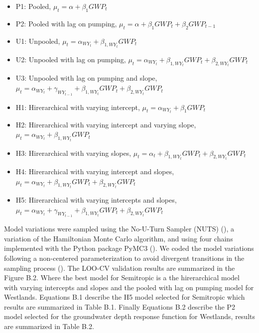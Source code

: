 \documentclass[11pt,a4paper]{article}
\begin{document}
\begin{itemize}[noitemsep,topsep=0pt,parsep=0pt,partopsep=0pt]
  \item P1: Pooled,   $\mu_t = \alpha + \beta_{1}GWP_{t}$
  \item P2: Pooled with lag on pumping,   $\mu_t = \alpha + \beta_{1}GWP_{t} + \beta_{2}GWP_{t-1} $
  \item U1: Unpooled, $\mu_t = \alpha_{WY_{t}} + \beta_{1,WY_{t}}GWP_{t}$
  \item U2: Unpooled with lag on pumping, $\mu_t = \alpha_{WY_{t}} + \beta_{1,WY_{t}}GWP_{t} + \beta_{2,WY_{t}}GWP_{t} $
  \item U3: Unpooled with lag on pumping and slope, $\mu_t =  \alpha_{WY_{t}} + \gamma_{WY_{t-1}} + \beta_{1,WY_{t}}GWP_{t} + \beta_{2,WY_{t}}GWP_{t}$
  \item H1: Hirerarchical with varying intercept, $\mu_t = \alpha_{WY_{t}} + \beta_{1}GWP_{t}$
  \item H2: Hirerarchical with varying intercept and varying slope, $\mu_t = \alpha_{WY_{t}} + \beta_{1,WY_{t}}GWP_{t}$
  \item H3: Hirerarchical with varying slopes, $\mu_t = \alpha_t + \beta_{1,WY_{t}}GWP_{t} + \beta_{2,WY_{t}}GWP_{t}$
  \item H4: Hirerarchical with varying intercept and slopes, $\mu_t = \alpha_{WY_{t}} + \beta_{1,WY_{t}}GWP_{t} + \beta_{2,WY_{t}}GWP_{t}$
  \item H5: Hirerarchical with varying intercepts and slopes, $\mu_t = \alpha_{WY_{t}} + \gamma_{WY_{t-1}} + \beta_{1,WY_{t}}GWP_{t} + \beta_{2,WY_{t}}GWP_{t}$
\end{itemize}


Model variations were sampled using the No-U-Turn Sampler (NUTS) (\cite{homan_no-u-turn_2014}), a variation of the Hamiltonian Monte Carlo algorithm, and using four chains implemented with the Python package PyMC3  (\cite{salvatier_probabilistic_2016}). We coded the model variations following a non-centered parameterization to avoid divergent transitions in the sampling process (\cite{mcelreath_statistical_2020}). The LOO-CV validation results are summarized in the Figure B.2. Where the best model for Semitropic is a the hirerarchical model with varying intercepts and slopes and the pooled with lag on pumping model for Westlands. Equations B.1 describe the H5 model selected for Semitropic which results are summarized in Table B.1. Finally Equations B.2 describe the P2 model selected for the groundwater depth response function for Westlands, results are summarized in Table B.2.
\end{document}
